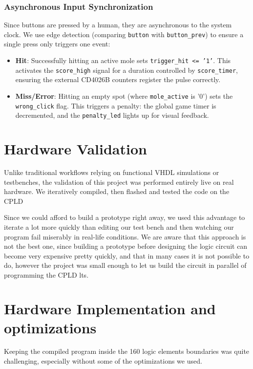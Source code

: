 \documentclass[12pt,a4paper]{article}
\begin{document}
\subsubsection{Asynchronous Input Synchronization}
Since buttons are pressed by a human, they are asynchronous to the system clock. We use edge detection (comparing \texttt{button} with \texttt{button\_prev}) to ensure a single press only triggers one event:
\begin{itemize}
    \item \textbf{Hit}: Successfully hitting an active mole sets \texttt{trigger\_hit <= '1'}. This activates the \texttt{score\_high} signal for a duration controlled by \texttt{score\_timer}, ensuring the external CD4026B counters register the pulse correctly.
    \item \textbf{Miss/Error}: Hitting an empty spot (where \texttt{mole\_active} is '0') sets the \texttt{wrong\_click} flag. This triggers a penalty: the global game timer is decremented, and the \texttt{penalty\_led} lights up for visual feedback.
\end{itemize}

\section{Hardware Validation}
Unlike traditional workflows relying on functional VHDL simulations or testbenches, the validation of this project was performed entirely live on real hardware. We iteratively compiled, then flashed and tested the code on the CPLD

Since we could afford to build a prototype right away, we used this advantage to iterate a lot more quickly than editing our test bench and then watching our program fail miserably in real-life conditions.%
We are aware that this approach is not the best one, since building a prototype before designing the logic circuit can become very expensive pretty quickly, and that in many cases it is not possible to do, however the project was small enough to let us build the circuit in parallel of programming the CPLD
lts.

\section{Hardware Implementation and optimizations}
Keeping the compiled program inside the 160 logic elements boundaries was quite challenging, especially without some of the optimizations we used. 
\end{document}
